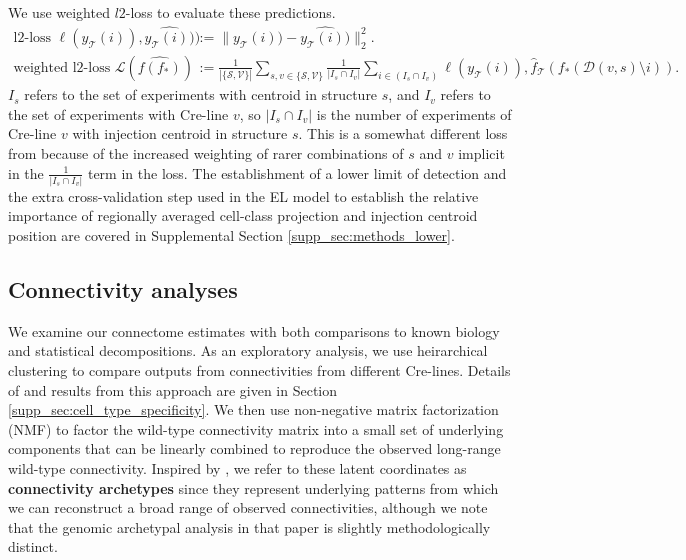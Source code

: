 We use weighted $l2$-loss to evaluate these predictions.
\begin{align*}
\text{l2-loss } \ell (y_{\mathcal T}(i)),\widehat {y_{\mathcal T}(i))}) &:=   \| y_{\mathcal T} (i)) - \widehat {y_{\mathcal T}(i))} \|_2^2. \\
\text{weighted l2-loss } \mathcal L ( \widehat {f(f_*)}) &:= \frac{1}{|\{\mathcal S,\mathcal V\}|} \sum_{s,v \in \{\mathcal S,\mathcal V\}} \frac{1}{ |I_{s} \cap I_v |} \sum_{i \in (I_{s} \cap I_v ) } \ell (y_{\mathcal T}(i)), \hat f_{\mathcal T} (f_*(\mathcal D(v,s) \setminus i)) .
\end{align*}
$I_s$ refers to the set of experiments with centroid in structure $s$, and $I_v$ refers to the set of experiments with Cre-line $v$, so $|I_s \cap I_v|$ is the number of experiments of Cre-line $v$ with injection centroid in structure $s$.
This is a somewhat different loss from \citet{Knox2019-ot} because of the increased weighting of rarer combinations of $s$ and $v$ implicit in the $\frac{1}{ |I_{s} \cap I_v |}$ term in the loss.
The establishment of a lower limit of detection and the extra cross-validation step used in the EL model to establish the relative importance of regionally averaged cell-class projection and injection centroid position are covered in Supplemental Section \ref{supp_sec:methods_lower}.

\newpage

\subsection{Connectivity analyses}

We examine our connectome estimates with both comparisons to known biology and statistical decompositions.
As an exploratory analysis, we use heirarchical clustering to compare outputs from connectivities from different Cre-lines. 
Details of and results from this approach are given in Section \ref{supp_sec:cell_type_specificity}.
We then use non-negative matrix factorization (NMF) to factor the wild-type connectivity matrix into a small set of underlying components that can be linearly combined to reproduce the observed long-range wild-type connectivity.
Inspired by \citet{Mohammadi2018-te}, we refer to these latent coordinates as \textbf{connectivity archetypes} since they represent underlying patterns from which we can reconstruct a broad range of observed connectivities, although we note that the genomic archetypal analysis in that paper is slightly methodologically distinct.

